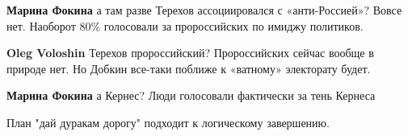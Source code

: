 \begin{itemize}
\begin{itemize} %
\textbf{Марина Фокина} а там разве Терехов ассоциировался с «анти-Россией»? Вовсе нет. Наоборот 80\% голосовали за пророссийских по имиджу политиков.

\textbf{Oleg Voloshin} Терехов пророссийский? Пророссийских сейчас вообще в природе нет. Но Добкин все-таки поближе к «ватному» электорату будет.

\textbf{Марина Фокина} а Кернес? Люди голосовали фактически за тень Кернеса
\end{itemize} %

План "дай дуракам дорогу" подходит к логическому завершению.

\end{itemize} %
